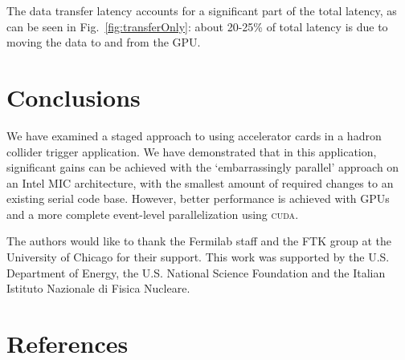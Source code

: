 \documentclass[letterpaper]{jpconf}
\begin{document}
The data transfer latency accounts for a significant part of the total
latency, as can be seen in Fig.~\ref{fig:transferOnly}: about 20-25\%
of total latency is due to moving the data to and from the GPU.


\section{Conclusions}
We have examined a staged approach to using accelerator cards in a
hadron collider trigger application. We have demonstrated that in this
application, significant gains can be achieved with the
`embarrassingly parallel' approach on an Intel MIC
architecture, with the smallest amount of required changes to an
existing serial code base. However, better performance is achieved
with GPUs and a more complete event-level parallelization using
\textsc{cuda}. 

\ack
The authors would like to thank the Fermilab staff and the FTK group at the 
University of Chicago for their support. This work was supported by the
U.S. Department of Energy, the U.S. National Science Foundation and the Italian
Istituto Nazionale di Fisica Nucleare. 

\section*{References}







 
\end{document}
